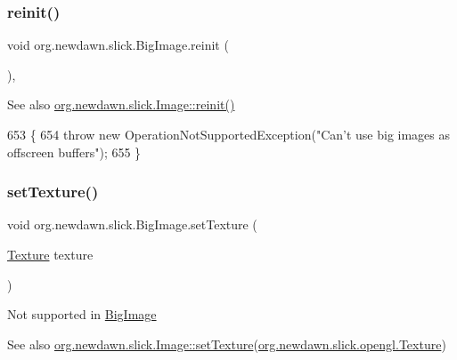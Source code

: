 \subsubsection{\texorpdfstring{reinit()}{reinit()}}
{\footnotesize\ttfamily void org.\+newdawn.\+slick.\+Big\+Image.\+reinit (\begin{DoxyParamCaption}{ }\end{DoxyParamCaption})\hspace{0.3cm}{\ttfamily [inline]}, {\ttfamily [protected]}}

\begin{DoxySeeAlso}{See also}
\mbox{\hyperlink{classorg_1_1newdawn_1_1slick_1_1_image_ac959cc9bd3258690a9eb51359df1f6df}{org.\+newdawn.\+slick.\+Image\+::reinit()}} 
\end{DoxySeeAlso}

\begin{DoxyCode}
653                             \{
654         \textcolor{keywordflow}{throw} \textcolor{keyword}{new} OperationNotSupportedException(\textcolor{stringliteral}{"Can't use big images as offscreen buffers"});
655     \}
\end{DoxyCode}
\mbox{\label{classorg_1_1newdawn_1_1slick_1_1_big_image_a98c19cf26b95da7cc6da105672d8664c}} 
\subsubsection{\texorpdfstring{set\+Texture()}{setTexture()}}
{\footnotesize\ttfamily void org.\+newdawn.\+slick.\+Big\+Image.\+set\+Texture (\begin{DoxyParamCaption}\item[{\mbox{\hyperlink{interfaceorg_1_1newdawn_1_1slick_1_1opengl_1_1_texture}{Texture}}}]{texture }\end{DoxyParamCaption})\hspace{0.3cm}{\ttfamily [inline]}}

Not supported in \mbox{\hyperlink{classorg_1_1newdawn_1_1slick_1_1_big_image}{Big\+Image}}

\begin{DoxySeeAlso}{See also}
\mbox{\hyperlink{classorg_1_1newdawn_1_1slick_1_1_image_a73b8afaa9bb100680f5bec87f4a75cdb}{org.\+newdawn.\+slick.\+Image\+::set\+Texture}}(\mbox{\hyperlink{interfaceorg_1_1newdawn_1_1slick_1_1opengl_1_1_texture}{org.\+newdawn.\+slick.\+opengl.\+Texture}}) 
\end{DoxySeeAlso}


